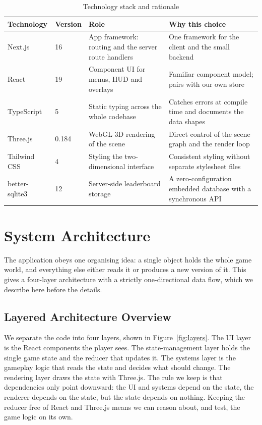 \documentclass[12pt,a4paper]{report}
\begin{document}
\begin{table}[htbp]
\centering
\caption{Technology stack and rationale}
\label{tab:stack}
\begin{tabular}{|p{2.6cm}|p{1.2cm}|p{4.0cm}|p{4.2cm}|}
\hline
Technology & Version & Role & Why this choice \\
\hline
Next.js & 16 & App framework: routing and the server route handlers &
One framework for the client and the small backend \\
\hline
React & 19 & Component UI for menus, HUD and overlays &
Familiar component model; pairs with our own store \\
\hline
TypeScript & 5 & Static typing across the whole codebase &
Catches errors at compile time and documents the data shapes \\
\hline
Three.js & 0.184 & WebGL 3D rendering of the scene &
Direct control of the scene graph and the render loop \\
\hline
Tailwind CSS & 4 & Styling the two-dimensional interface &
Consistent styling without separate stylesheet files \\
\hline
better-sqlite3 & 12 & Server-side leaderboard storage &
A zero-configuration embedded database with a synchronous API \\
\hline
\end{tabular}
\end{table}

\section{System Architecture}

The application obeys one organising idea: a single object holds the whole game
world, and everything else either reads it or produces a new version of it. This
gives a four-layer architecture with a strictly one-directional data flow, which
we describe here before the details.

\subsection{Layered Architecture Overview}

We separate the code into four layers, shown in Figure~\ref{fig:layers}. The UI
layer is the React components the player sees. The state-management layer holds
the single game state and the reducer that updates it. The systems layer is the
gameplay logic that reads the state and decides what should change. The
rendering layer draws the state with Three.js. The rule we keep is that
dependencies only point downward: the UI and systems depend on the state, the
renderer depends on the state, but the state depends on nothing. Keeping the
reducer free of React and Three.js means we can reason about, and test, the game
logic on its own.
\end{document}
